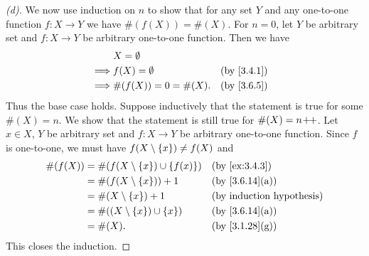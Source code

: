 \begin{proof}[(d)]
	We now use induction on \(n\) to show that for any set \(Y\) and any one-to-one function \(f : X \to Y\) we have \(\#(f(X)) = \#(X)\).
	For \(n = 0\), let \(Y\) be arbitrary set and \(f : X \to Y\) be arbitrary one-to-one function.
	Then we have
	\begin{align*}
		         & X = \emptyset                         \\
		\implies & f(X) = \emptyset      &  & \by{3.4.1} \\
		\implies & \#(f(X)) = 0 = \#(X). &  & \by{3.6.5}
	\end{align*}
	Thus the base case holds.
	Suppose inductively that the statement is true for some \(\#(X) = n\).
	We show that the statement is still true for \(\#(X) = n\!+\!\!+\).
	Let \(x \in X\), \(Y\) be arbitrary set and \(f : X \to Y\) be arbitrary one-to-one function.
	Since \(f\) is one-to-one, we must have \(f(X \setminus \left\lbrace x\right\rbrace) \neq f(X)\) and
	\begin{align*}
		\#(f(X)) & = \#(f(X \setminus \set{x}) \cup \set{f(x)}) &  & \by{ex:3.4.3}                \\
		         & = \#(f(X \setminus \set{x})) + 1             &  & \text{(by \cref{3.6.14}(a))} \\
		         & = \#(X \setminus \set{x}) + 1                &  & \byIH                        \\
		         & = \#((X \setminus \set{x}) \cup \set{x})     &  & \text{(by \cref{3.6.14}(a))} \\
		         & = \#(X).                                     &  & \text{(by \cref{3.1.28}(g))}
	\end{align*}
	This closes the induction.
\end{proof}

